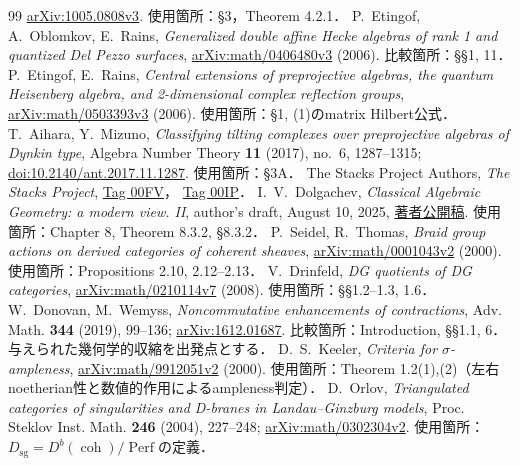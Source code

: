 \documentclass[11pt,a4paper]{ltjsarticle}
\theoremstyle{definition}
\DeclareMathOperator{\coh}{coh}\DeclareMathOperator{\qgr}{qgr}
\DeclareMathOperator{\Perf}{Perf}\DeclareMathOperator{\Pic}{Pic}
\begin{document}
\begin{thebibliography}{99}
\href{https://arxiv.org/abs/1005.0808v3}{arXiv:1005.0808v3}.
使用箇所：\S3，Theorem 4.2.1．
P.~Etingof, A.~Oblomkov, E.~Rains, \emph{Generalized double affine Hecke algebras of rank 1 and quantized Del Pezzo surfaces},
\href{https://arxiv.org/abs/math/0406480v3}{arXiv:math/0406480v3} (2006).
比較箇所：\S\S1, 11．
P.~Etingof, E.~Rains, \emph{Central extensions of preprojective algebras, the quantum Heisenberg algebra, and 2-dimensional complex reflection groups},
\href{https://arxiv.org/abs/math/0503393v3}{arXiv:math/0503393v3} (2006).
使用箇所：\S1, (1)のmatrix Hilbert公式．
T.~Aihara, Y.~Mizuno, \emph{Classifying tilting complexes over preprojective algebras of Dynkin type},
Algebra Number Theory \textbf{11} (2017), no.~6, 1287--1315;
\href{https://doi.org/10.2140/ant.2017.11.1287}{doi:10.2140/ant.2017.11.1287}.
使用箇所：\S3A．
The Stacks Project Authors, \emph{The Stacks Project},
\href{https://stacks.math.columbia.edu/tag/00FV}{Tag 00FV}，
\href{https://stacks.math.columbia.edu/tag/00IP}{Tag 00IP}．
I.~V.~Dolgachev, \emph{Classical Algebraic Geometry: a modern view. II},
author's draft, August 10, 2025,
\href{https://sites.lsa.umich.edu/idolga/wp-content/uploads/sites/1467/2025/10/CAG-2.pdf}{著者公開稿}.
使用箇所：Chapter 8, Theorem 8.3.2, \S8.3.2．
P.~Seidel, R.~Thomas, \emph{Braid group actions on derived categories of coherent sheaves},
\href{https://arxiv.org/abs/math/0001043}{arXiv:math/0001043v2} (2000).
使用箇所：Propositions 2.10, 2.12--2.13．
V.~Drinfeld, \emph{DG quotients of DG categories},
\href{https://arxiv.org/abs/math/0210114}{arXiv:math/0210114v7} (2008).
使用箇所：\S\S1.2--1.3, 1.6．
W.~Donovan, M.~Wemyss, \emph{Noncommutative enhancements of contractions},
Adv. Math. \textbf{344} (2019), 99--136;
\href{https://arxiv.org/abs/1612.01687}{arXiv:1612.01687}.
比較箇所：Introduction, \S\S1.1, 6．与えられた幾何学的収縮を出発点とする．
D.~S.~Keeler, \emph{Criteria for $\sigma$-ampleness},
\href{https://arxiv.org/abs/math/9912051}{arXiv:math/9912051v2} (2000).
使用箇所：Theorem 1.2(1),(2)（左右noetherian性と数値的作用によるampleness判定）．
D.~Orlov, \emph{Triangulated categories of singularities and D-branes in Landau--Ginzburg models},
Proc. Steklov Inst. Math. \textbf{246} (2004), 227--248;
\href{https://arxiv.org/abs/math/0302304}{arXiv:math/0302304v2}.
使用箇所：$D_{\mathrm{sg}}=D^b(\coh)/\Perf$の定義．

\end{thebibliography}
\end{document}
